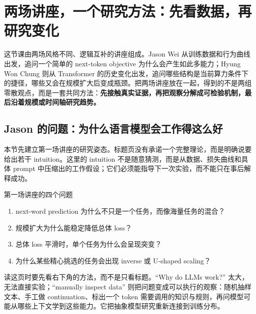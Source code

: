 \section{两场讲座，一个研究方法：先看数据，再研究变化}

这节课由两场风格不同、逻辑互补的讲座组成。Jason Wei 从训练数据和行为曲线出发，追问一个简单的 next-token objective 为什么会产生如此多能力；Hyung Won Chung 则从 Transformer 的历史变化出发，追问哪些结构是当前算力条件下的捷径，哪些又会在规模扩大后变成瓶颈。把两场讲座放在一起，得到的不是两组零散观点，而是一套共同方法：\textbf{先接触真实证据，再把观察分解成可检验机制，最后沿着规模或时间轴研究趋势。}

\subsection{Jason 的问题：为什么语言模型会工作得这么好}

本节先建立第一场讲座的研究姿态。标题页没有承诺一个完整理论，而是明确说要给出若干 intuition。这里的 intuition 不是随意猜测，而是从数据、损失曲线和具体 prompt 中压缩出的工作假设；它们必须能指导下一次实验，而不能只在事后解释成功。


\begin{importantbox}{第一场讲座的四个问题}
\begin{enumerate}
  \item next-word prediction 为什么不只是一个任务，而像海量任务的混合？
  \item 规模扩大为什么能稳定降低总体 loss？
  \item 总体 loss 平滑时，单个任务为什么会呈现突变？
  \item 为什么某些精心挑选的任务会出现 inverse 或 U-shaped scaling？
\end{enumerate}
\end{importantbox}


读这页时要先看右下角的方法，而不是只看标题。``Why do LLMs work?'' 太大，无法直接实验；``manually inspect data'' 则把问题变成可以执行的观察：随机抽样文本、手工做 continuation、标出一个 token 需要调用的知识与规则，再问模型可能从哪些上下文学到这些能力。它把抽象模型研究重新连接到训练分布。



